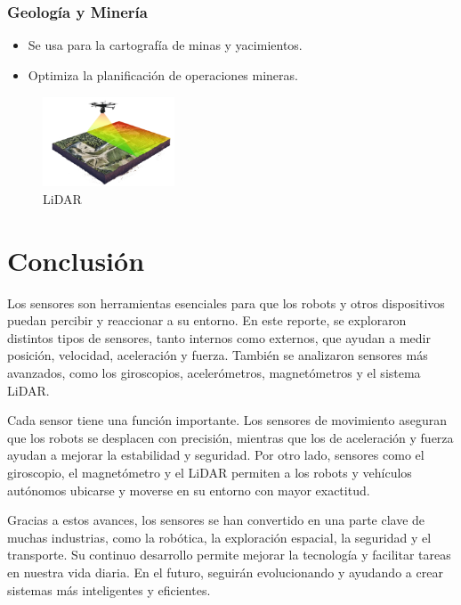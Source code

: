 \documentclass{article}
\begin{document}
	\subsubsection{Geología y Minería}
	\begin{itemize}
		\item Se usa para la cartografía de minas y yacimientos.
		\item Optimiza la planificación de operaciones mineras.
	\end{itemize}
		\begin{figure}[H]
		\centering
		\includegraphics[width=0.35\textwidth]{lidar.png}
		\caption{LiDAR}
	\end{figure}
	
	\newpage
	\section{Conclusión} Los sensores son herramientas esenciales para que los robots y otros dispositivos puedan percibir y reaccionar a su entorno. En este reporte, se exploraron distintos tipos de sensores, tanto internos como externos, que ayudan a medir posición, velocidad, aceleración y fuerza. También se analizaron sensores más avanzados, como los giroscopios, acelerómetros, magnetómetros y el sistema LiDAR.
	
	Cada sensor tiene una función importante. Los sensores de movimiento aseguran que los robots se desplacen con precisión, mientras que los de aceleración y fuerza ayudan a mejorar la estabilidad y seguridad. Por otro lado, sensores como el giroscopio, el magnetómetro y el LiDAR permiten a los robots y vehículos autónomos ubicarse y moverse en su entorno con mayor exactitud.
	
	Gracias a estos avances, los sensores se han convertido en una parte clave de muchas industrias, como la robótica, la exploración espacial, la seguridad y el transporte. Su continuo desarrollo permite mejorar la tecnología y facilitar tareas en nuestra vida diaria. En el futuro, seguirán evolucionando y ayudando a crear sistemas más inteligentes y eficientes.
	
	
	
	
	
	
	
		\newpage
	\nocite{*}
	
	
\end{document}
